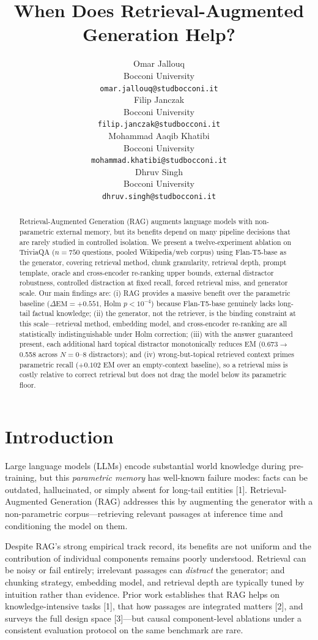\documentclass{article}
\title{When Does Retrieval-Augmented Generation Help?}
\author{%
  Omar Jallouq \\
  Bocconi University \\
  \texttt{omar.jallouq@studbocconi.it} \\
  \And
  Filip Janczak \\
  Bocconi University \\
  \texttt{filip.janczak@studbocconi.it} \\
  \And
  Mohammad Aaqib Khatibi \\
  Bocconi University \\
  \texttt{mohammad.khatibi@studbocconi.it} \\
  \And
  Dhruv Singh \\
  Bocconi University \\
  \texttt{dhruv.singh@studbocconi.it}\\
}
\begin{document}
\maketitle

\begin{abstract}
Retrieval-Augmented Generation (RAG) augments language models with
non-parametric external memory, but its benefits depend on many
pipeline decisions that are rarely studied in controlled isolation.
We present a twelve-experiment ablation on TriviaQA ($n\!=\!750$
questions, pooled Wikipedia/web corpus) using Flan-T5-base as the
generator, covering retrieval method, chunk granularity, retrieval
depth, prompt template, oracle and cross-encoder re-ranking upper
bounds, external distractor robustness, controlled distraction at
fixed recall, forced retrieval miss, and generator scale.
Our main findings are:
(i) RAG provides a massive benefit over the parametric baseline
($\Delta\mathrm{EM}\!=\!{+0.551}$, Holm $p\!<\!10^{-4}$) because
Flan-T5-base genuinely lacks long-tail factual knowledge;
(ii) the generator, not the retriever, is the binding constraint at
this scale---retrieval method, embedding model, and cross-encoder
re-ranking are all statistically indistinguishable under Holm
correction;
(iii) with the answer guaranteed present, each additional hard topical
distractor monotonically reduces EM (0.673$\to$0.558 across
$N\!=\!0$--$8$ distractors); and
(iv) wrong-but-topical retrieved context primes parametric recall
($+0.102$ EM over an empty-context baseline), so a retrieval miss
is costly relative to correct retrieval but does not drag the model
below its parametric floor.
\end{abstract}

\section{Introduction}

Large language models (LLMs) encode substantial world knowledge during
pre-training, but this \emph{parametric memory} has well-known failure
modes: facts can be outdated, hallucinated, or simply absent for
long-tail entities [1].
Retrieval-Augmented Generation (RAG) addresses this by augmenting the
generator with a non-parametric corpus---retrieving relevant passages
at inference time and conditioning the model on them.

Despite RAG's strong empirical track record, its benefits are not
uniform and the contribution of individual components remains poorly
understood.
Retrieval can be noisy or fail entirely; irrelevant passages can
\emph{distract} the generator; and chunking strategy, embedding model,
and retrieval depth are typically tuned by intuition rather than
evidence.
Prior work establishes that RAG helps on knowledge-intensive tasks [1],
that how passages are integrated matters [2], and surveys the full
design space [3]---but causal component-level ablations under a
consistent evaluation protocol on the same benchmark are rare.
\end{document}
